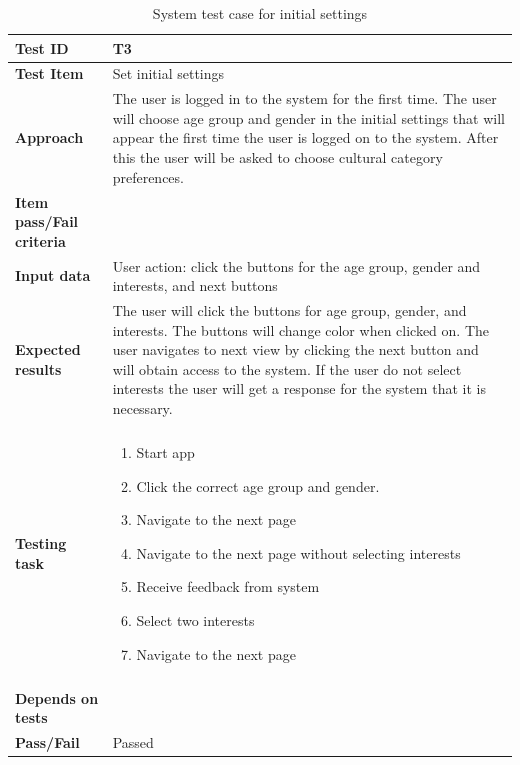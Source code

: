 \begin{appendices}
\begin{table}[H]
	\label{Tab_systemTesting2}
	\end{table}

	\begin{table}[H]
		\small
		\centering
		\caption{System test case for initial settings}
		\begin{tabular}{ | l | l |}			
			\hline
			\textbf{Test ID} & T3  \\ \hline
			\textbf{Test Item} & Set initial settings \\ \hline
			\textbf{Approach} & \begin{minipage}{5in}The user is logged in to the system for the first time. The user will choose age group and gender in the initial settings that will appear the first time the user is logged on to the system. After this the user will be asked to choose cultural category preferences.  \end{minipage}\\ \hline
			\textbf{Item pass/Fail criteria} & \\ \hline
			\textbf{Input data} & \begin{minipage}{5in} User action: click the buttons for the age group, gender and interests, and next buttons  \end{minipage}\\ \hline
			\textbf{Expected results} & \begin{minipage}{5in}The user will click the buttons for age group, gender, and interests. The buttons will change color when clicked on. The user navigates to next view by clicking the next button and will obtain access to the system. If the user do not select interests the user will get a response for the system that it is necessary. \end{minipage}\\ \hline&\\[-3.8ex]
			\textbf{Testing task} & \begin{minipage}{5in}
			\begin{enumerate}[noitemsep]
				\item Start app
				\item Click the correct age group and gender.
				\item Navigate to the next page
				\item Navigate to the next page without selecting interests
				\item Receive feedback from system
				\item Select two interests
				\item Navigate to the next page
			\end{enumerate}\end{minipage}
			\\ &\\[-3.8ex]\hline
			\textbf{Depends on tests} & \\ \hline	
			\textbf{Pass/Fail} & Passed \\\hline				
		\end{tabular}
	\label{Tab:systemTesting3}
	\end{table}



\end{appendices}
